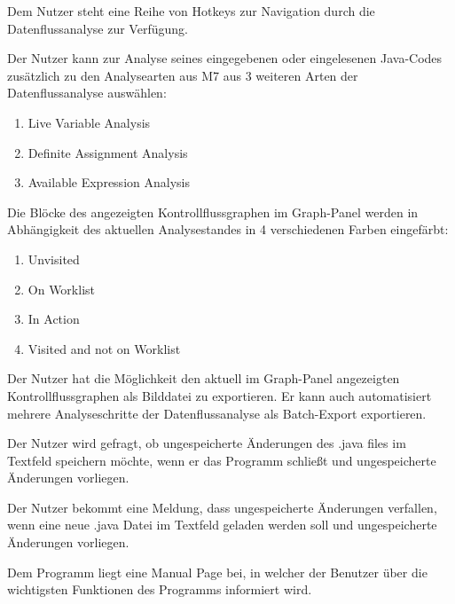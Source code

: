 Dem Nutzer steht eine Reihe von Hotkeys zur Navigation durch die
Datenflussanalyse zur Verfügung.

Der Nutzer kann zur Analyse seines eingegebenen oder eingelesenen Java-Codes
zusätzlich zu den Analysearten aus M7 aus 3 weiteren Arten der Datenflussanalyse
auswählen:
\begin{enumerate}[label=(\alph*)]
\item  Live Variable Analysis
\item Definite Assignment Analysis
\item Available Expression Analysis
\end{enumerate}

Die Blöcke des angezeigten Kontrollflussgraphen im Graph-Panel werden in
Abhängigkeit des aktuellen Analysestandes in 4 verschiedenen Farben eingefärbt:
\begin{enumerate}[label=(\alph*)]
\item Unvisited
\item On Worklist
\item In Action
\item Visited and not on Worklist
\end{enumerate}

Der Nutzer hat die Möglichkeit den aktuell im Graph-Panel angezeigten Kontrollflussgraphen als Bilddatei zu exportieren. Er kann auch automatisiert mehrere Analyseschritte der Datenflussanalyse als Batch-Export exportieren.

Der Nutzer wird gefragt, ob ungespeicherte Änderungen des .java files im Textfeld
speichern möchte, wenn er das Programm schließt und ungespeicherte Änderungen vorliegen.

Der Nutzer bekommt eine Meldung, dass ungespeicherte Änderungen verfallen,
wenn eine neue .java Datei im Textfeld geladen werden soll und ungespeicherte
Änderungen vorliegen.

Dem Programm liegt eine Manual Page bei, in welcher der Benutzer über die wichtigsten Funktionen des Programms informiert wird.


